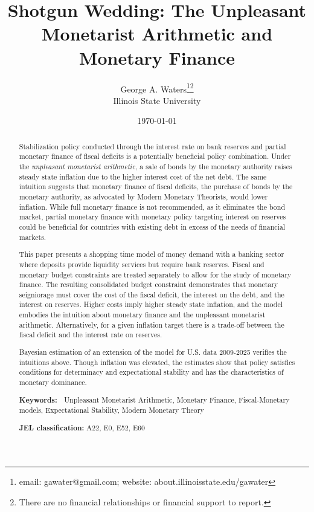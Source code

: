 \documentclass[]{article}
\begin{document}
\title{Shotgun Wedding: The Unpleasant Monetarist Arithmetic and Monetary Finance}
\date{\textsf{\today}}
\author{George A. Waters\footnote{email:  gawater@gmail.com;  website:  about.illinoisstate.edu/gawater}\footnote{There are no financial relationships or financial support to report.}
\\Illinois State University}
\maketitle


\begin{abstract}
Stabilization policy conducted through the interest rate on bank reserves and partial monetary finance of fiscal deficits is a potentially beneficial policy combination. Under the \textit{unpleasant monetarist arithmetic}, a sale of bonds by the monetary authority raises steady state inflation due to the higher interest cost of the net debt. The same intuition suggests that monetary finance of fiscal deficits, the purchase of bonds by the monetary authority, as advocated by Modern Monetary Theorists, would lower inflation. While full monetary finance is not recommended, as it eliminates the bond market, partial monetary finance with monetary policy targeting interest on reserves could be beneficial for countries with existing debt in excess of the needs of financial markets.

This paper presents a shopping time model of money demand with a banking sector where deposits provide liquidity services but require bank reserves. Fiscal and monetary budget constraints are treated separately to allow for the study of monetary finance. The resulting consolidated budget constraint demonstrates that monetary seigniorage must cover the cost of the fiscal deficit, the interest on the debt, and the interest on reserves. Higher costs imply higher steady state inflation, and the model embodies the intuition about monetary finance and the unpleasant monetarist arithmetic. Alternatively, for a given inflation target there is a trade-off between the fiscal deficit and the interest rate on reserves. 

Bayesian estimation of an extension of the model for U.S. data 2009-2025 verifies the intuitions above. Though inflation was elevated, the estimates show that policy satisfies conditions for determinacy and expectational stability and has the characteristics of monetary dominance.

\textbf{Keywords: \ }Unpleasant Monetarist
Arithmetic, Monetary Finance, Fiscal-Monetary models, Expectational Stability, Modern Monetary Theory

\textbf{JEL classification: }A22, E0, E52, E60
\end{abstract}
\end{document}

